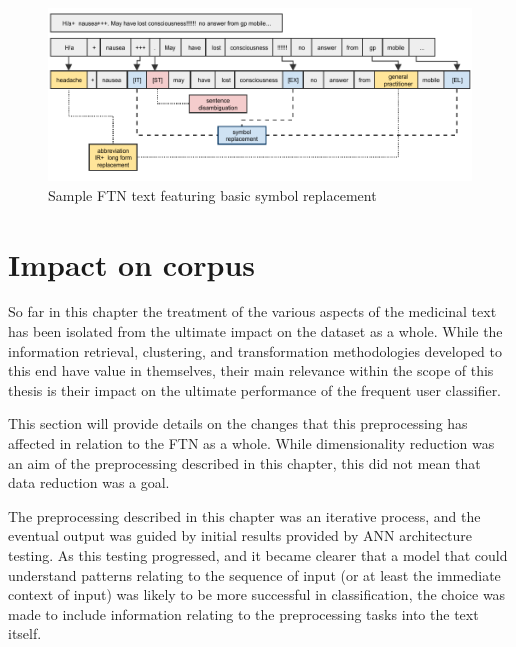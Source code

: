 \begin{figure}[htbp]
   \begin{center}

 \includegraphics[width=1.0\textwidth]{Figs/scheme-word-replacement.pdf} 

 \caption{Sample FTN text featuring basic symbol replacement}
 \label{fig:word-replacement}
  \end{center}
\end{figure}

\section{Impact on corpus}
\label{section:preproccesing-impact-on-corpus}

So far in this chapter the treatment of the various aspects of the medicinal text has been isolated from the ultimate impact on the dataset as a whole. While the information retrieval, clustering, and transformation methodologies developed to this end have value in themselves, their main relevance within the scope of this thesis is their impact on the ultimate performance of the frequent user classifier.  

This section will provide details on the changes that this preprocessing has affected in relation to the FTN as a whole. While dimensionality reduction was an aim of the preprocessing described in this chapter, this did not mean that data reduction was a goal.

The preprocessing described in this chapter was an iterative process, and the eventual output was guided by initial results provided by ANN architecture testing. As this testing progressed, and it became clearer that a model that could understand patterns relating to the sequence of input (or at least the immediate context of input) was likely to be more successful in classification, the choice was made to include information relating to the preprocessing tasks into the text itself.

